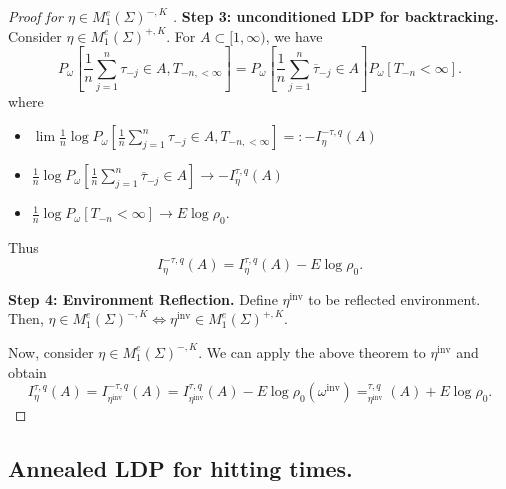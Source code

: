 \begin{proof}[Proof for $\eta \in M_1^e(\Sigma)^{-, K}$ ]
	\textbf{Step 3: unconditioned LDP for backtracking.}
	Consider $\eta \in M_1^e (\Sigma)^{+, K}$. For $A \subset [1, \infty )$, we have
	\[
		P_\omega \left[ \frac{1}{n}\sum_{j=1}^{n} \tau_{-j} \in A, T_{-n, < \infty } \right] 
		= P_\omega\left[ \frac{1}{n}\sum_{j=1}^{n} \overline{\tau} _{-j}\in A \right] P_\omega \left[ T_{-n} < \infty  \right] 
	.\] 
	where
	\begin{itemize}
		\item $\lim \frac{1}{n}\log P_\omega \left[ \frac{1}{n}\sum_{j=1}^{n} \tau_{-j} \in A, T_{-n, < \infty } \right] =: - I_ \eta^{- \tau, q}(A)$ 
		\item $\frac{1}{n} \log P_\omega\left[ \frac{1}{n}\sum_{j=1}^{n} \overline{\tau} _{-j}\in A \right] \to  - I_ \eta ^{\tau, q}(A)$
		\item $\frac{1}{n} \log P_\omega \left[ T_{-n} < \infty  \right] \to E \log \rho_0$.
	\end{itemize}
	Thus
	\[
		I_ \eta^{- \tau, q}(A) = I_ \eta^{\tau, q}(A) - E \log \rho_0
	.\] 

	\textbf{Step 4: Environment Reflection.}
	Define $\eta^{\text{inv}}$ to be reflected environment. Then, $\eta \in M_1^e(\Sigma)^{-,K} \iff \eta^{\text{inv}} \in M_1^e(\Sigma)^{+,K}$. 
	
	Now, consider $\eta \in M_1^e(\Sigma)^{-,K}$. We can apply the above theorem to $\eta^{\text{inv}}$ and obtain
	\[
		I_ \eta^{\tau, q}(A) = I_ {\eta^{\text{inv}}}^{- \tau, q}(A) = I_ {\eta^{\text{inv}}}^{\tau, q}(A) - E \log \rho_0(\omega^{\text{inv}}) = _ {\eta^{\text{inv}}}^{\tau, q}(A) + E \log \rho_0
	.\]
	
\end{proof}



\subsection{Annealed LDP for hitting times.}


